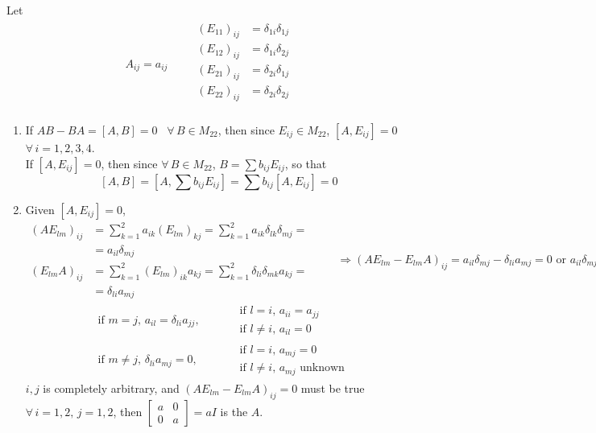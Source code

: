 \documentclass[twoside]{amsart}
\theoremstyle{plain}
\theoremstyle{definition}
\newcommand{\exercisehead}[1]
  {
   \noindent{\small\bf Exercise #1.}
   \smallskip}
\begin{document}
\exercisehead{11} Let \[
\begin{gathered}
  A_{ij} = a_{ij} \quad \quad \, \begin{aligned} (E_{11})_{ij} & = \delta_{1i} \delta_{1j} \\ 
 (E_{12})_{ij} & = \delta_{1i} \delta_{2j} \\ 
 (E_{21})_{ij} & = \delta_{2i} \delta_{1j} \\ 
 (E_{22})_{ij} & = \delta_{2i} \delta_{2j} \\ 
\end{aligned}
\end{gathered}
\]
\begin{enumerate}
\item If $AB-BA = [A,B] = 0$ \, $\forall \, B \in M_{22}$, then since $E_{ij} \in M_{22}$, $[A,E_{ij}] =0$ \, $\forall \, i = 1,2,3,4$.  \\

 If $[A,E_{ij}] = 0$, then since $\forall \, B \in M_{22}$, $B = \sum b_{ij} E_{ij}$, so that 
\[
[A,B] = [A, \sum b_{ij} E_{ij} ] = \sum b_{ij} [A,E_{ij} ] = 0 
\]
\item Given $[A,E_{ij}] = 0$, 
\[
\begin{aligned}
  (AE_{lm})_{ij} & = \sum_{k=1}^2 a_{ik} (E_{lm})_{kj} = \sum_{k=1}^2 a_{ik} \delta_{lk} \delta_{mj} = \\
  & = a_{il} \delta_{mj} \\
  (E_{lm} A)_{ij} & = \sum_{k=1}^2 (E_{lm})_{ik} a_{kj} = \sum_{k=1}^2 \delta_{li} \delta_{mk} a_{kj} = \\
  & = \delta_{li} a_{mj}
\end{aligned} \quad \quad \, \Longrightarrow (AE_{lm} - E_{lm} A)_{ij} = a_{il} \delta_{mj} - \delta_{li} a_{mj} = 0 \text{ or } a_{il} \delta_{mj} = \delta_{li} a_{mj} 
\]
\[
\begin{aligned}
  & \text{ if } m = j, \, a_{il} = \delta_{li} a_{jj}, \quad \, & \begin{aligned} & \text{ if } l = i, \, a_{ii} = a_{jj} \\ & \text{ if } l \neq i , \, a_{il} = 0 \end{aligned} \\ 
  & \text{ if } m \neq j , \, \delta_{li} a_{mj} = 0 , \quad \, & \begin{aligned} & \text{ if } l = i, \, a_{mj} = 0 \\ & \text{ if } l \neq i, \, a_{mj} \text{ unknown } \end{aligned}
\end{aligned}
\]
$i,j$ is completely arbitrary, and $(AE_{lm} - E_{lm} A)_{ij}  =0 $ must be true $\forall \, i = 1,2, \, j = 1,2$, then $\left[ \begin{matrix} a & 0 \\ 0 & a \end{matrix} \right] = a I $ is the $A$.  
\end{enumerate}
\end{document}
